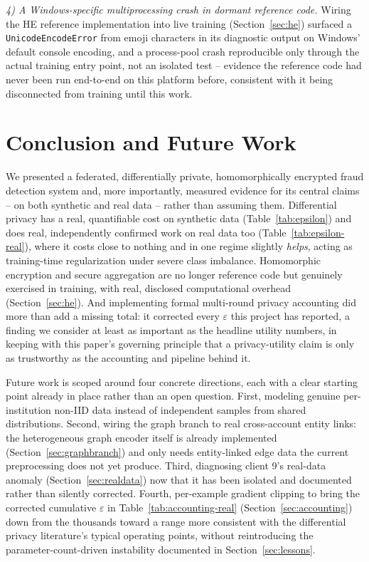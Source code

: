 \documentclass[12pt]{svproc}
\begin{document}
\textit{4) A Windows-specific multiprocessing crash in dormant reference
code.} Wiring the HE reference implementation into live training
(Section~\ref{sec:he}) surfaced a \texttt{UnicodeEncodeError} from
emoji characters in its diagnostic output on Windows' default console
encoding, and a process-pool crash reproducible only through the actual
training entry point, not an isolated test -- evidence the reference
code had never been run end-to-end on this platform before, consistent
with it being disconnected from training until this work.

\section{Conclusion and Future Work}
\label{sec:conclusion}
We presented a federated, differentially private, homomorphically
encrypted fraud detection system and, more importantly, measured
evidence for its central claims -- on both synthetic and real data --
rather than assuming them. Differential privacy has a real, quantifiable
cost on synthetic data (Table~\ref{tab:epsilon}) and does real,
independently confirmed work on real data too
(Table~\ref{tab:epsilon-real}), where it costs close to nothing and in
one regime slightly \emph{helps}, acting as training-time
regularization under severe class imbalance. Homomorphic encryption and
secure aggregation are no longer reference code but genuinely exercised
in training, with real, disclosed computational overhead
(Section~\ref{sec:he}). And implementing formal multi-round privacy
accounting did more than add a missing total: it corrected every
$\varepsilon$ this project has reported, a finding we consider at least
as important as the headline utility numbers, in keeping with this
paper's governing principle that a privacy-utility claim is only as
trustworthy as the accounting and pipeline behind it.

Future work is scoped around four concrete directions, each with a
clear starting point already in place rather than an open question.
First, modeling genuine per-institution non-IID data instead of
independent samples from shared distributions. Second, wiring the
graph branch to real cross-account entity links: the heterogeneous
graph encoder itself is already implemented (Section~\ref{sec:graphbranch})
and only needs entity-linked edge data the current preprocessing does
not yet produce. Third, diagnosing client 9's real-data anomaly
(Section~\ref{sec:realdata}) now that it has been isolated and
documented rather than silently corrected. Fourth, per-example
gradient clipping to bring the corrected cumulative $\varepsilon$ in
Table~\ref{tab:accounting-real} (Section~\ref{sec:accounting}) down
from the thousands toward a range more consistent with the
differential privacy literature's typical operating points, without
reintroducing the parameter-count-driven instability documented in
Section~\ref{sec:lessons}.
\end{document}
